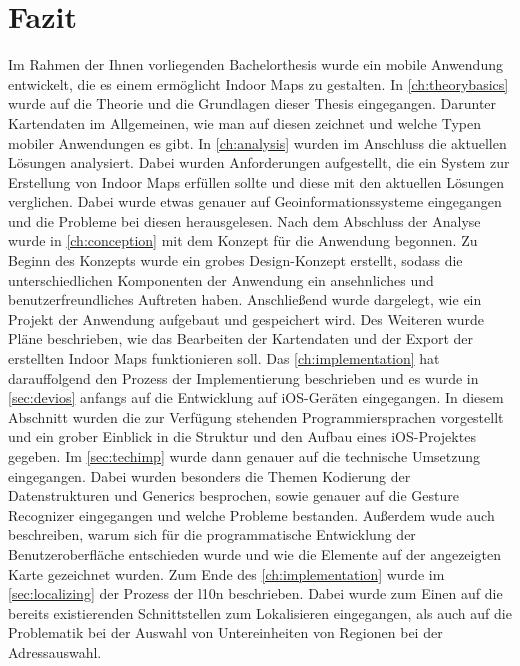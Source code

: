 \chapter{Fazit}
\label{ch:conclusion}
Im Rahmen der Ihnen vorliegenden Bachelorthesis wurde ein mobile Anwendung entwickelt, die es einem ermöglicht Indoor Maps zu gestalten.
In \autoref{ch:theorybasics} wurde auf die Theorie und die Grundlagen dieser Thesis eingegangen.
Darunter Kartendaten im Allgemeinen, wie man auf diesen zeichnet und welche Typen mobiler Anwendungen es gibt.\pbreak%
%
In \autoref{ch:analysis} wurden im Anschluss die aktuellen Lösungen analysiert.
Dabei wurden Anforderungen aufgestellt, die ein System zur Erstellung von Indoor Maps erfüllen sollte und diese mit den aktuellen Lösungen verglichen.
Dabei wurde etwas genauer auf Geoinformationssysteme eingegangen und die Probleme bei diesen herausgelesen.\pbreak%
%
Nach dem Abschluss der Analyse wurde in \autoref{ch:conception} mit dem Konzept für die Anwendung begonnen.
Zu Beginn des Konzepts wurde ein grobes Design-Konzept erstellt, sodass die unterschiedlichen Komponenten der Anwendung ein ansehnliches und benutzerfreundliches Auftreten haben.
Anschließend wurde dargelegt, wie ein Projekt der Anwendung aufgebaut und gespeichert wird.
Des Weiteren wurde Pläne beschrieben, wie das Bearbeiten der Kartendaten und der Export der erstellten Indoor Maps funktionieren soll.\pbreak%
%
Das \autoref{ch:implementation} hat darauffolgend den Prozess der Implementierung beschrieben und es wurde in \autoref{sec:devios} anfangs auf die Entwicklung auf iOS-Geräten eingegangen.
In diesem Abschnitt wurden die zur Verfügung stehenden Programmiersprachen vorgestellt und ein grober Einblick in die Struktur und den Aufbau eines iOS-Projektes gegeben.
Im \autoref{sec:techimp} wurde dann genauer auf die technische Umsetzung eingegangen.
Dabei wurden besonders die Themen Kodierung der Datenstrukturen und Generics besprochen, sowie genauer auf die Gesture Recognizer eingegangen und welche Probleme bestanden.
Außerdem wude auch beschreiben, warum sich für die programmatische Entwicklung der Benutzeroberfläche entschieden wurde und wie die Elemente auf der angezeigten Karte gezeichnet wurden.\pbreak%
%
Zum Ende des \autoref{ch:implementation} wurde im \autoref{sec:localizing} der Prozess der \Gls{l10n} beschrieben.
Dabei wurde zum Einen auf die bereits existierenden Schnittstellen zum Lokalisieren eingegangen, als auch auf die Problematik bei der Auswahl von Untereinheiten von Regionen bei der Adressauswahl.

